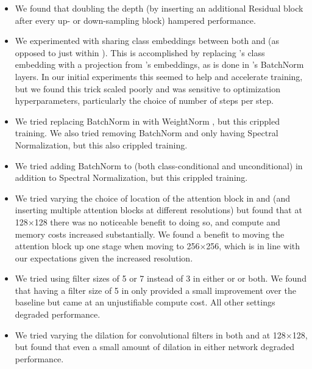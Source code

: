 \begin{itemize}
\item We found that doubling the depth (by inserting an additional Residual block after every up- or down-sampling block) hampered performance. 

\item We experimented with sharing class embeddings between both \gen{} and \discr{} (as opposed to just within \gen{}). This is accomplished by replacing \discr{}'s class embedding with a projection from \gen{}'s embeddings, as is done in \gen{}'s BatchNorm layers. In our initial experiments this seemed to help and accelerate training, but we found this trick scaled poorly and was sensitive to optimization hyperparameters, particularly the choice of number of \discr{} steps per \gen{} step.

\item We tried replacing BatchNorm in \gen{} with WeightNorm \citep{salimans2016weightnorm}, but this crippled training. We also tried removing BatchNorm and only having Spectral Normalization, but this also crippled training.

\item We tried adding BatchNorm to \discr{} (both class-conditional and unconditional) in addition to Spectral Normalization, but this crippled training.

\item We tried varying the choice of location of the attention block in \gen{} and \discr{} (and inserting multiple attention blocks at different resolutions) but found that at 128$\times$128 there was no noticeable benefit to doing so, and compute and memory costs increased substantially. We found a benefit to moving the attention block up one stage when moving to 256$\times$256, which is in line with our expectations given the increased resolution.

\item We tried using filter sizes of 5 or 7 instead of 3 in either \gen{} or \discr{} or both. We found that having a filter size of 5 in \gen{} only provided a small improvement over the baseline but came at an unjustifiable compute cost. All other settings degraded performance. 
\item We tried varying the dilation for convolutional filters in both \gen{} and \discr{} at 128$\times$128, but found that even a small amount of dilation in either network degraded performance.


\end{itemize}
